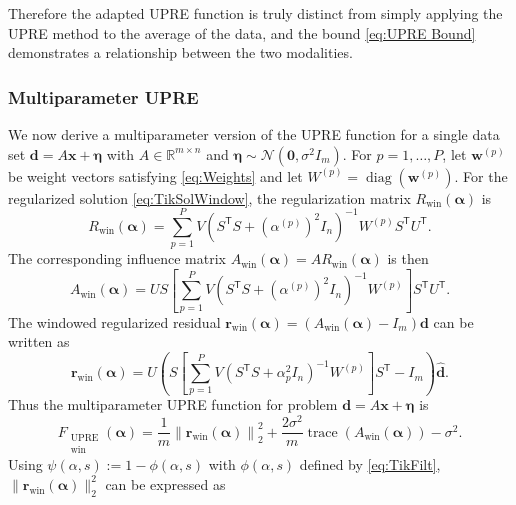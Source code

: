 \documentclass[12pt]{article}
\newcommand{\mA}{m}	%
\newcommand{\dVec}{\mathbf{d}}	%
\newcommand{\rVec}{\mathbf{r}}	%
\newcommand{\xVec}{\mathbf{x}}	%
\newcommand{\wVec}{\mathbf{w}}	%
\newcommand{\trans}[1]{{#1}^\mathsf{T}}	%
\newcommand{\inv}[1]{{#1}^{-1}}	%
\DeclareMathOperator{\trace}{trace}		%
\DeclareMathOperator{\diag}{diag}	%
\newcommand{\dft}[1]{\widehat{#1}}	%
\newcommand{\regparam}{\alpha}  %
\newcommand{\regparamVec}{\bm{\regparam}}   %
\newcommand{\filt}{\phi}
\newcommand{\mfilt}{\psi}
\newcommand{\noise}{\eta}	%
\newcommand{\noiseSD}{\sigma}	%
\newcommand{\noiseVec}{\bm{\noise}}	%
\newcommand{\zeroVec}{\bm{0}}	%
\newcommand{\singular}{s}	%
\newcommand{\UWin}{F_{\substack{\text{UPRE} \\ \text{win}}}}	%
\begin{document}
\noindent Therefore the adapted UPRE function is truly distinct from simply applying the UPRE method to the average of the data, and the bound \eqref{eq:UPRE Bound} demonstrates a relationship between the two modalities.

\subsubsection{Multiparameter UPRE}
We now derive a multiparameter version of the UPRE function for a single data set $\dVec = A\xVec + \noiseVec$ with $A \in \mathbb{R}^{\mA \times n}$ and $\noiseVec \sim \mathcal{N}(\zeroVec,\noiseSD^2 I_{\mA})$. For $p = 1,\ldots,P$, let $\wVec^{(p)}$ be weight vectors satisfying \eqref{eq:Weights} and let $W^{(p)} = \diag(\wVec^{(p)})$. For the regularized solution \eqref{eq:TikSolWindow}, the regularization matrix $R_\text{win}(\regparamVec)$ is
\begin{equation}
\label{eq:Windowed Reg Matrix}
    R_\text{win}(\regparamVec) = \sum_{p=1}^P V\inv{\left(\trans{S}S + \left(\regparam^{(p)}\right)^2 I_{n}\right)}W^{(p)}\trans{S}\trans{U}.
\end{equation}
The corresponding influence matrix $A_\text{win}(\regparamVec) = AR_\text{win}(\regparamVec)$ is then
\begin{equation}
\label{eq:Windowed Influence Matrix}
    A_\text{win}(\regparamVec) = US\left[\sum_{p=1}^P V\inv{\left(\trans{S}S + \left(\regparam^{(p)}\right)^2 I_n\right)}W^{(p)}\right]\trans{S}\trans{U}. 
\end{equation}
The windowed regularized residual $\rVec_\text{win}(\regparamVec) = (A_\text{win}(\regparamVec) - I_{\mA})\dVec$ can be written as
\begin{equation}
    \rVec_\text{win}(\regparamVec) = U\left(S\left[\sum_{p=1}^P V\inv{\left(\trans{S}S + \regparam_{p}^2 I_n\right)}W^{(p)}\right]\trans{S} - I_{\mA}\right)\dft{\dVec}.
\end{equation}
Thus the multiparameter UPRE function for problem $\dVec = A\xVec + \noiseVec$ is 
\begin{equation}
\label{eq:Multiparameter UPRE}
    \UWin(\regparamVec) = \frac{1}{\mA}\left\|\rVec_\text{win}(\regparamVec)\right\|_2^2 + \frac{2\noiseSD^2}{\mA}\trace\left(A_\text{win}(\regparamVec)\right) - \noiseSD^2.
\end{equation}
Using $\mfilt(\regparam,\singular) := 1 - \filt(\regparam,\singular)$ with $\filt(\regparam,\singular)$ defined by \eqref{eq:TikFilt}, $\|\rVec_\text{win}(\regparamVec)\|_2^2$ can be expressed as
\end{document}
